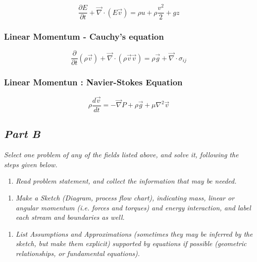 \documentclass{article}
\begin{document}
\begin{equation}
\frac{\partial E}{\partial t} + \vec{\nabla} \cdot (E \vec{v}) = \rho u + \rho \frac{v^2}{2} + g z
\end{equation}

\subsubsection*{Linear Momentum - Cauchy's equation}

\begin{equation}
\frac{\partial}{\partial t} (\rho \vec{v}) + \vec{\nabla} \cdot (\rho \vec{v} \vec{v}) = \rho \vec{g} + \vec{\nabla} \cdot \sigma_{ij}
\end{equation}

\subsubsection*{Linear Momentun : Navier-Stokes Equation}

\begin{equation}
\rho \frac{d \vec{v}}{d t} = - \vec{\nabla} P + \rho \vec{g} + \mu \nabla^2 \vec{v}
\end{equation}









\subsection*{\emph{Part B}}
\textit{Select one problem of any of the fields listed above, and solve it, following the steps given below.}

\begin{enumerate}
\item \textit{Read problem statement, and collect the information that may be needed.}
\end{enumerate}



\begin{enumerate}[resume]
\item \textit{Make a Sketch (Diagram, process flow chart), indicating mass, linear or angular momentum (i.e. forces and torques) and energy interaction, and label each stream and boundaries as well.}
\end{enumerate}



\begin{enumerate}[resume]
\item \textit{List Assumptions and Approximations (sometimes they may be inferred by the sketch, but make them explicit) supported by equations if possible (geometric relationships, or fundamental equations).}
\end{enumerate}
\end{document}
